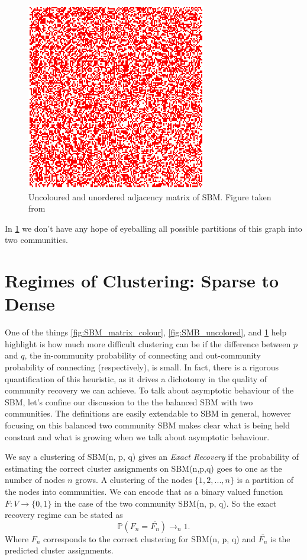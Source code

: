 \begin{figure}[h]
\begin{center}
  \includegraphics[scale=0.5]{SBM_unordered}
  \caption{Uncoloured and unordered adjacency matrix of SBM.  Figure taken from \cite{SBM_adjacency_talk}}
  \label{fig:SMB_unordered}
 \end{center}
\end{figure}

In \ref{fig:SMB_unordered} we don't have any hope of eyeballing all possible partitions of this graph into two communities.  

\section{Regimes of Clustering: Sparse to Dense}

One of the things \ref{fig:SBM_matrix_colour}, \ref{fig:SMB_uncolored}, and \ref{fig:SMB_unordered} help highlight is how much more difficult clustering can be if the difference between $p$ and $q$, the in-community probability of connecting and out-community probability of connecting (respectively), is small.  In fact, there is a rigorous quantification of this heuristic, as it drives a dichotomy in the quality of community recovery we can achieve. 
To talk about asymptotic behaviour of the SBM, let's confine our discussion to the the balanced SBM with two communities.  The definitions are easily extendable to SBM in general, however focusing on this balanced two community SBM makes clear what is being held constant and what is growing when we talk about asymptotic behaviour. 


\begin{definition}
We say a clustering of SBM(n, p, q) gives an \textit{Exact Recovery} if the probability of estimating the correct cluster assignments on SBM(n,p,q) goes to one as the number of nodes $n$ grows.  A clustering of the nodes $\{1, 2, ..., n\}$ is a partition of the nodes into communities.  We can encode that as a binary valued function $F : V \rightarrow \{0,1\}$ in the case of the two community SBM(n, p, q). So the exact recovery regime can be stated as $$\mathbb{P}( F_n = \bar{F_n}) \rightarrow_n 1.$$  Where $F_n$ corresponds to the correct clustering for SBM(n, p, q) and $\bar{F_n}$ is the predicted cluster assignments.   
\end{definition}

